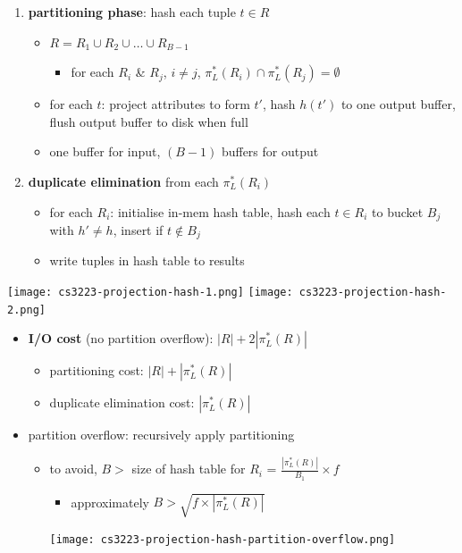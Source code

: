 \documentclass[9pt, landscape]{extarticle}
\begin{document}
\begin{multicols*}{4}
  \begin{enumerate}
    \item \textbf{partitioning phase}: hash each tuple $t \in R$ 
      \begin{itemize}
        \item $R = R_1 \cup R_2 \cup \dots \cup R_{B-1}$
          \begin{itemize}
            \item for each $R_i$ \& $R_j$, $i \neq j$, $\pi_L^*(R_i) \cap \pi_L^*(R_j) = \emptyset$
          \end{itemize}
        \item for each $t$: project attributes to form $t'$, hash $h(t')$ to one output buffer, flush output buffer to disk when full
        \item one buffer for input, $(B-1)$ buffers for output
      \end{itemize}
    \item \textbf{duplicate elimination} from each $\pi^*_L(R_i)$
      \begin{itemize}
        \item for each $R_i$: initialise in-mem hash table, hash each $t \in R_i$ to bucket $B_j$ with $h' \neq h$, insert if $t \not\in B_j$
        \item write tuples in hash table to results
      \end{itemize}
  \end{enumerate}
  \texttt{[image: cs3223-projection-hash-1.png]} 
  \texttt{[image: cs3223-projection-hash-2.png]} 

  \begin{itemize}
    \item \textbf{I/O cost} (no partition overflow): $|R| + 2|\pi^*_L(R)|$
      \begin{itemize}
        \item partitioning cost: $|R| + |\pi^*_L(R)|$
        \item duplicate elimination cost: $|\pi^*_L(R)|$
      \end{itemize}
    \item partition overflow: recursively apply partitioning
      \begin{itemize}
        \item to avoid, $B>$ size of hash table for $R_i$ = $\frac{|\pi^*_L(R)|}{B_1} \times f$
          \begin{itemize}
            \item  approximately $B> \sqrt{f\times |\pi^*_L(R)|}$
          \end{itemize}
          \texttt{[image: cs3223-projection-hash-partition-overflow.png]} 
      \end{itemize}
  \end{itemize}


\end{multicols*}
\end{document}
